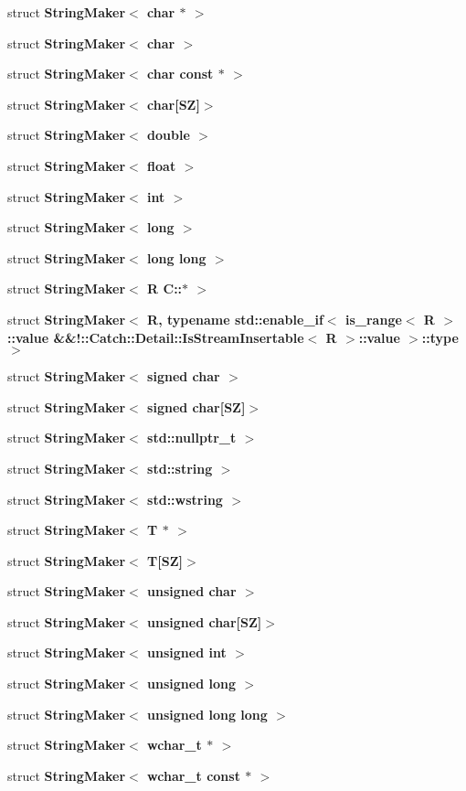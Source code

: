 \begin{DoxyCompactItemize}
\item 
struct \textbf{ String\+Maker$<$ char $\ast$ $>$}
\item 
struct \textbf{ String\+Maker$<$ char $>$}
\item 
struct \textbf{ String\+Maker$<$ char const $\ast$ $>$}
\item 
struct \textbf{ String\+Maker$<$ char[\+S\+Z]$>$}
\item 
struct \textbf{ String\+Maker$<$ double $>$}
\item 
struct \textbf{ String\+Maker$<$ float $>$}
\item 
struct \textbf{ String\+Maker$<$ int $>$}
\item 
struct \textbf{ String\+Maker$<$ long $>$}
\item 
struct \textbf{ String\+Maker$<$ long long $>$}
\item 
struct \textbf{ String\+Maker$<$ R C\+::$\ast$ $>$}
\item 
struct \textbf{ String\+Maker$<$ R, typename std\+::enable\+\_\+if$<$ is\+\_\+range$<$ R $>$\+::value \&\&!\+::\+Catch\+::\+Detail\+::\+Is\+Stream\+Insertable$<$ R $>$\+::value $>$\+::type $>$}
\item 
struct \textbf{ String\+Maker$<$ signed char $>$}
\item 
struct \textbf{ String\+Maker$<$ signed char[\+S\+Z]$>$}
\item 
struct \textbf{ String\+Maker$<$ std\+::nullptr\+\_\+t $>$}
\item 
struct \textbf{ String\+Maker$<$ std\+::string $>$}
\item 
struct \textbf{ String\+Maker$<$ std\+::wstring $>$}
\item 
struct \textbf{ String\+Maker$<$ T $\ast$ $>$}
\item 
struct \textbf{ String\+Maker$<$ T[\+S\+Z]$>$}
\item 
struct \textbf{ String\+Maker$<$ unsigned char $>$}
\item 
struct \textbf{ String\+Maker$<$ unsigned char[\+S\+Z]$>$}
\item 
struct \textbf{ String\+Maker$<$ unsigned int $>$}
\item 
struct \textbf{ String\+Maker$<$ unsigned long $>$}
\item 
struct \textbf{ String\+Maker$<$ unsigned long long $>$}
\item 
struct \textbf{ String\+Maker$<$ wchar\+\_\+t $\ast$ $>$}
\item 
struct \textbf{ String\+Maker$<$ wchar\+\_\+t const $\ast$ $>$}

\end{DoxyCompactItemize}
